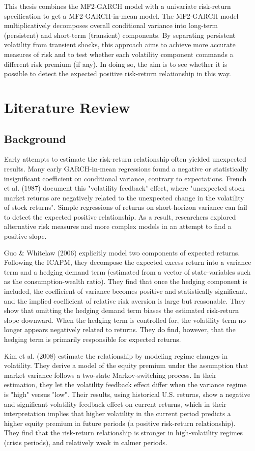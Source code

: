 \documentclass[12pt]{article}
\begin{document}
This thesis combines the MF2-GARCH model with a univariate risk-return specification to get a MF2-GARCH-in-mean model. The MF2-GARCH model multiplicatively decomposes overall conditional variance into long-term (persistent) and short-term (transient) components. By separating persistent volatility from transient shocks, this approach aims to achieve more accurate measures of risk and to test whether each volatility component commands a different risk premium (if any). In doing so, the aim is to see whether it is possible to detect the expected positive risk-return relationship in this way.

\section{Literature Review}
\subsection{Background}
Early attempts to estimate the risk-return relationship often yielded unexpected results. Many early GARCH-in-mean regressions found a negative or statistically insignificant coefficient on conditional variance, contrary to expectations. French et al. (1987) document this "volatility feedback" effect, where "unexpected stock market returns are negatively related to the unexpected change in the volatility of stock returns". Simple regressions of returns on short-horizon variance can fail to detect the expected positive relationship. As a result, researchers explored alternative risk measures and more complex models in an attempt to find a positive slope.\par
Guo \& Whitelaw (2006) explicitly model two components of expected returns. Following the ICAPM, they decompose the expected excess return into a variance term and a hedging demand term (estimated from a vector of state-variables such as the consumption-wealth ratio). They find that once the hedging component is included, the coefficient of variance becomes positive and statistically significant, and the implied coefficient of relative risk aversion is large but reasonable. They show that omitting the hedging demand term biases the estimated risk‐return slope downward. When the hedging term is controlled for, the volatility term no longer appears negatively related to returns. They do find, however, that the hedging term is primarily responsible for expected returns.\par
Kim et al. (2008) estimate the relationship by modeling regime changes in volatility. They derive a model of the equity premium under the assumption that market variance follows a two-state Markov-switching process. In their estimation, they let the volatility feedback effect differ when the variance regime is "high" versus "low". Their results, using historical U.S. returns, show a negative and significant volatility feedback effect on current returns, which in their interpretation implies that higher volatility in the current period predicts a higher equity premium in future periods (a positive risk-return relationship). They find that the risk-return relationship is stronger in high-volatility regimes (crisis periods), and relatively weak in calmer periods.\par
\end{document}
